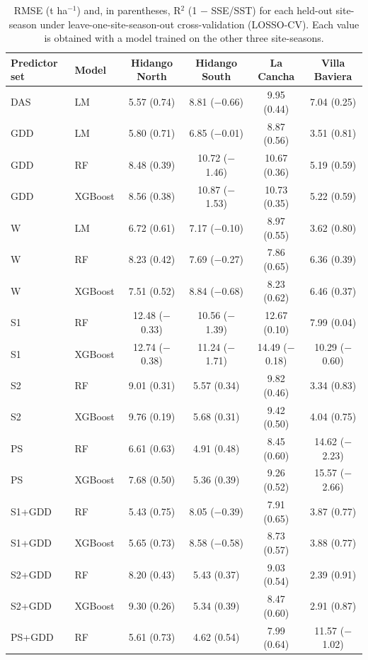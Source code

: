 \begin{table}[htbp]
\centering
\footnotesize
\caption{RMSE (t ha$^{-1}$) and, in parentheses, R$^2$ (1 $-$ SSE/SST) for each held-out site-season under leave-one-site-season-out cross-validation (LOSSO-CV). Each value is obtained with a model trained on the other three site-seasons.}
\label{tbl-s2}
\begin{tabular}{l l c c c c}
\toprule
\textbf{Predictor set} & \textbf{Model} & \textbf{Hidango North} & \textbf{Hidango South} & \textbf{La Cancha} & \textbf{Villa Baviera} \\
\midrule
DAS & LM & 5.57 (0.74) & 8.81 ($-$0.66) & 9.95 (0.44) & 7.04 (0.25) \\
GDD & LM & 5.80 (0.71) & 6.85 ($-$0.01) & 8.87 (0.56) & 3.51 (0.81) \\
GDD & RF & 8.48 (0.39) & 10.72 ($-$1.46) & 10.67 (0.36) & 5.19 (0.59) \\
GDD & XGBoost & 8.56 (0.38) & 10.87 ($-$1.53) & 10.73 (0.35) & 5.22 (0.59) \\
W & LM & 6.72 (0.61) & 7.17 ($-$0.10) & 8.97 (0.55) & 3.62 (0.80) \\
W & RF & 8.23 (0.42) & 7.69 ($-$0.27) & 7.86 (0.65) & 6.36 (0.39) \\
W & XGBoost & 7.51 (0.52) & 8.84 ($-$0.68) & 8.23 (0.62) & 6.46 (0.37) \\
S1 & RF & 12.48 ($-$0.33) & 10.56 ($-$1.39) & 12.67 (0.10) & 7.99 (0.04) \\
S1 & XGBoost & 12.74 ($-$0.38) & 11.24 ($-$1.71) & 14.49 ($-$0.18) & 10.29 ($-$0.60) \\
S2 & RF & 9.01 (0.31) & 5.57 (0.34) & 9.82 (0.46) & 3.34 (0.83) \\
S2 & XGBoost & 9.76 (0.19) & 5.68 (0.31) & 9.42 (0.50) & 4.04 (0.75) \\
PS & RF & 6.61 (0.63) & 4.91 (0.48) & 8.45 (0.60) & 14.62 ($-$2.23) \\
PS & XGBoost & 7.68 (0.50) & 5.36 (0.39) & 9.26 (0.52) & 15.57 ($-$2.66) \\
S1+GDD & RF & 5.43 (0.75) & 8.05 ($-$0.39) & 7.91 (0.65) & 3.87 (0.77) \\
S1+GDD & XGBoost & 5.65 (0.73) & 8.58 ($-$0.58) & 8.73 (0.57) & 3.88 (0.77) \\
S2+GDD & RF & 8.20 (0.43) & 5.43 (0.37) & 9.03 (0.54) & 2.39 (0.91) \\
S2+GDD & XGBoost & 9.30 (0.26) & 5.34 (0.39) & 8.47 (0.60) & 2.91 (0.87) \\
PS+GDD & RF & 5.61 (0.73) & 4.62 (0.54) & 7.99 (0.64) & 11.57 ($-$1.02) \\

\end{tabular}
\end{table}
